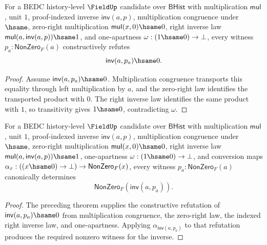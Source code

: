 \begin{theorem}
\label{thm:field-inverse-apart-empty-from-right-inverse-one-apartness}
For a BEDC history-level $\FieldUp$ candidate over $\mathsf{BHist}$ with
multiplication $\mathsf{mul}$, unit $1$, proof-indexed inverse
$\mathsf{inv}(a,p)$, multiplication congruence under $\hsame$, zero-right
multiplication $\mathsf{mul}(x,0)\hsame 0$, right inverse law
$\mathsf{mul}(a,\mathsf{inv}(a,p))\hsame 1$, and one-apartness
$\omega:(1\hsame 0)\to\bot$, every witness $p_a:\mathsf{NonZero}_F(a)$
constructively refutes
$$
\mathsf{inv}(a,p_a)\hsame 0.
$$
\end{theorem}
\begin{proof}
Assume $\mathsf{inv}(a,p_a)\hsame 0$. Multiplication congruence transports
this equality through left multiplication by $a$, and the zero-right law
identifies the transported product with $0$. The right inverse law identifies
the same product with $1$, so transitivity gives $1\hsame 0$, contradicting
$\omega$.
\end{proof}

\begin{theorem}
\label{thm:field-inverse-nonzero-from-right-inverse-one-apartness}
For a BEDC history-level $\FieldUp$ candidate over $\mathsf{BHist}$ with
multiplication $\mathsf{mul}$, unit $1$, proof-indexed inverse
$\mathsf{inv}(a,p)$, multiplication congruence under $\hsame$, zero-right
multiplication $\mathsf{mul}(x,0)\hsame 0$, right inverse law
$\mathsf{mul}(a,\mathsf{inv}(a,p))\hsame 1$, one-apartness
$\omega:(1\hsame 0)\to\bot$, and conversion maps
$\alpha_x:((x\hsame 0)\to\bot)\to\mathsf{NonZero}_F(x)$, every witness
$p_a:\mathsf{NonZero}_F(a)$ canonically determines
$$
\mathsf{NonZero}_F(\mathsf{inv}(a,p_a)).
$$
\end{theorem}
\begin{proof}
The preceding theorem supplies the constructive refutation of
$\mathsf{inv}(a,p_a)\hsame 0$ from multiplication congruence, the zero-right
law, the indexed right inverse law, and one-apartness. Applying
$\alpha_{\mathsf{inv}(a,p_a)}$ to that refutation produces the required
nonzero witness for the inverse.
\end{proof}
